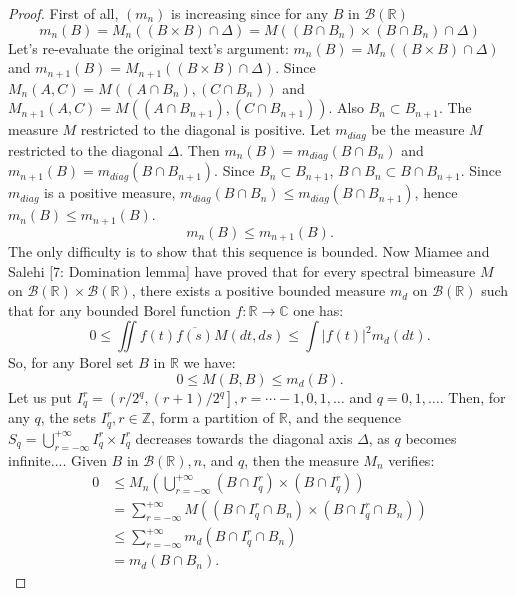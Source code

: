 \documentclass{article}
\begin{document}
\begin{proof}
First of all, \(\left(m_{n}\right)\) is increasing since for any \(B\) in \(\mathscr{B}(\mathbb{R})\)
\[
m_{n}(B)=M_{n}((B \times B) \cap \Delta) = M((B \cap B_n) \times (B \cap B_n) \cap \Delta) %
\]
Let's re-evaluate the original text's argument: $m_n(B) = M_n((B \times B) \cap \Delta)$ and $m_{n+1}(B) = M_{n+1}((B \times B) \cap \Delta)$. Since $M_n(A, C) = M((A \cap B_n), (C \cap B_n))$ and $M_{n+1}(A, C) = M((A \cap B_{n+1}), (C \cap B_{n+1}))$. Also $B_n \subset B_{n+1}$. The measure $M$ restricted to the diagonal is positive. Let $m_{diag}$ be the measure $M$ restricted to the diagonal $\Delta$. Then $m_n(B) = m_{diag}(B \cap B_n)$ and $m_{n+1}(B) = m_{diag}(B \cap B_{n+1})$. Since $B_n \subset B_{n+1}$, $B \cap B_n \subset B \cap B_{n+1}$. Since $m_{diag}$ is a positive measure, $m_{diag}(B \cap B_n) \leq m_{diag}(B \cap B_{n+1})$, hence $m_n(B) \leq m_{n+1}(B)$.
\[
m_{n}(B) \leqslant m_{n+1}(B) .
\]
The only difficulty is to show that this sequence is bounded. Now Miamee and Salehi [7: Domination lemma] have proved that for every spectral bimeasure \(M\) on \(\mathscr{B}(\mathbb{R}) \times \mathscr{B}(\mathbb{R})\), there exists a positive bounded measure \(m_{d}\) on \(\mathscr{B}(\mathbb{R})\) such that for any bounded Borel function \(f: \mathbb{R} \rightarrow \mathbb{C}\) one has:
\[
0 \leqslant \iint f(t) \overline{f(s)} M(d t, d s) \leqslant \int|f(t)|^{2} m_{d}(d t) .
\]
So, for any Borel set \(B\) in \(\mathbb{R}\) we have:
\[
0 \leqslant M(B, B) \leqslant m_{d}(B) .
\]
Let us put \(I_{q}^{r}=\left(r / 2^{q},(r+1) / 2^{q}\right], r=\cdots-1,0,1, \ldots\) and \(q=0,1, \ldots\). Then, for any \(q\), the sets \(I_{q}^{r}, r \in \mathbb{Z}\), form a partition of \(\mathbb{R}\), and the sequence \(S_q = \bigcup_{r=-\infty}^{+\infty} I_{q}^{r} \times I_{q}^{r}\) decreases towards the diagonal axis \(\Delta\), as \(q\) becomes infinite.... Given \(B\) in \(\mathscr{B}(\mathbb{R}), n\), and \(q\), then the measure \(M_{n}\) verifies:
\[
\begin{aligned}
0 & \leqslant M_{n}\left(\bigcup_{r=-\infty}^{+\infty}\left(B \cap I_{q}^{r}\right) \times\left(B \cap I_{q}^{r}\right)\right) \\
& =\sum_{r=-\infty}^{+\infty} M\left(\left(B \cap I_{q}^{r} \cap B_{n}\right) \times\left(B \cap I_{q}^{r} \cap B_{n}\right)\right) \\
& \leqslant \sum_{r=-\infty}^{+\infty} m_{d}\left(B \cap I_{q}^{r} \cap B_{n}\right) \\
& =m_{d}\left(B \cap B_{n}\right) .
\end{aligned}
\]
\end{proof}
\end{document}
